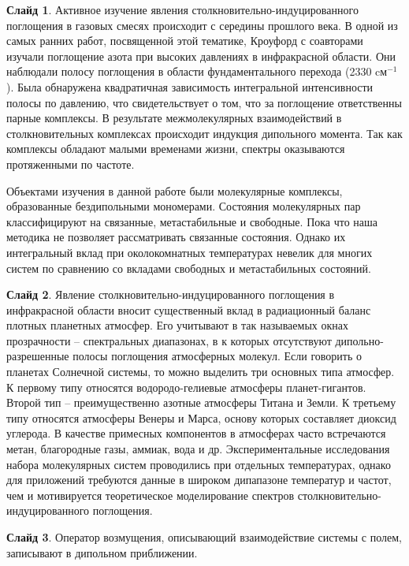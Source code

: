 \documentclass[12pt]{article}
\begin{document}
\textbf{Слайд 1}. Активное изучение явления столкновительно-индуцированного поглощения в газовых смесях происходит с середины прошлого века. В одной из самых ранних работ, посвященной этой тематике, Кроуфорд с соавторами изучали поглощение азота при высоких давлениях в инфракрасной области. Они наблюдали полосу поглощения в области фундаментального перехода (2330 cм$^{-1}$). Была обнаружена квадратичная зависимость интегральной интенсивности полосы по давлению, что свидетельствует о том, что за поглощение ответственны парные комплексы. В результате межмолекулярных взаимодействий в столкновительных комплексах происходит индукция дипольного момента. Так как комплексы обладают малыми временами жизни, спектры оказываются протяженными по частоте. \par 
Объектами изучения в данной работе были молекулярные комплексы, образованные бездипольными мономерами. Состояния молекулярных пар классифицируют на связанные, метастабильные и свободные. Пока что наша методика не позволяет рассматривать связанные состояния. Однако их интегральный вклад при околокомнатных температурах невелик для многих систем по сравнению со вкладами свободных и метастабильных состояний. \par 
\textbf{Слайд 2}. Явление столкновительно-индуцированного поглощения в инфракрасной области вносит существенный вклад в радиационный баланс плотных планетных атмосфер. Его учитывают в так называемых окнах прозрачности -- спектральных диапазонах, в к которых отсутствуют дипольно-разрешенные полосы поглощения атмосферных молекул. Если говорить о планетах Солнечной системы, то можно выделить три основных типа атмосфер. К первому типу относятся водородо-гелиевые атмосферы планет-гигантов. Второй тип -- преимущественно азотные атмосферы Титана и Земли. К третьему типу относятся атмосферы Венеры и Марса, основу которых составляет диоксид углерода. В качестве примесных компонентов в атмосферах часто встречаются метан, благородные газы, аммиак, вода и др. Экспериментальные исследования набора молекулярных систем проводились при отдельных температурах, однако для приложений требуются данные в широком дипапазоне температур и частот, чем и мотивируется теоретическое моделирование спектров столкновительно-индуцированного поглощения. \par
\textbf{Слайд 3}. Оператор возмущения, описывающий взаимодействие системы с полем, записывают в дипольном приближении. \par
\end{document}
